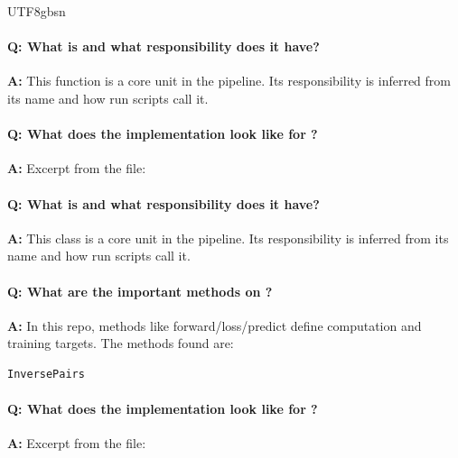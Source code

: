 \documentclass[11pt]{article}
\begin{document}
\begin{CJK*}{UTF8}{gbsn}
\vspace{1mm}


\paragraph{Q: What is \texttt{} and what responsibility does it have?}
\textbf{A:} This function is a core unit in the pipeline. Its responsibility is inferred from its name and how run scripts call it.

\paragraph{Q: What does the implementation look like for \texttt{}?}
\textbf{A:} Excerpt from the file:

\vspace{1mm}


\paragraph{Q: What is \texttt{} and what responsibility does it have?}
\textbf{A:} This class is a core unit in the pipeline. Its responsibility is inferred from its name and how run scripts call it.

\paragraph{Q: What are the important methods on \texttt{}?}
\textbf{A:} In this repo, methods like forward/loss/predict define computation and training targets. The methods found are:

\begin{Verbatim}[fontsize=\small]
InversePairs
\end{Verbatim}

\paragraph{Q: What does the implementation look like for \texttt{}?}
\textbf{A:} Excerpt from the file:

\vspace{1mm}



\end{CJK*}
\end{document}
